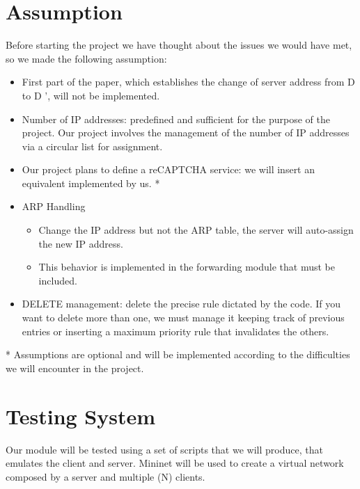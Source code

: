 \section{Assumption}
Before starting the project we have thought about the issues we would have met, so we made the following assumption:
\begin{itemize}
	\item First part of the paper, which establishes the change of server address from D to D ', will not be implemented.
	\item Number of IP addresses: predefined and sufficient for the purpose of the project. Our project involves the management of the number of IP addresses via a circular list for assignment. 
	\item Our project plans to define a reCAPTCHA service: we will insert an equivalent implemented by us. *
	\item ARP Handling 
		\begin{itemize}
			\item Change the IP address but not the ARP table, the server will auto-assign the new IP address.
			\item This behavior is implemented in the forwarding module that must be included.
		\end{itemize}
	\item DELETE management: delete the precise rule dictated by the code. If you want to delete more than one, we must manage it keeping track of previous entries or inserting a maximum priority rule that invalidates the others.
\end{itemize}
* Assumptions are optional and will be implemented according to the difficulties we will encounter in the project.

\section{Testing System}
Our module will be tested using a set of scripts that we will produce, that emulates the client and server. Mininet will be used to create a virtual network composed  by a server and multiple (N) clients.

